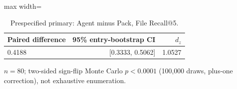 \begin{table}[t]
\centering
\caption{Prespecified primary: Agent minus Pack, File Recall@5.}\label{tab:primary}
\small
\begin{adjustbox}{max width=\columnwidth}\begin{tabular}{lrr}
\toprule
Paired difference & 95\% entry-bootstrap CI & $d_z$ \\
\midrule
0.4188 & [0.3333, 0.5062] & 1.0527 \\
\bottomrule
\end{tabular}\end{adjustbox}
\par\vspace{2pt}\begin{minipage}{\columnwidth}\footnotesize $n=80$; two-sided sign-flip Monte Carlo $p<0.0001$ (100,000 draws, plus-one correction), not exhaustive enumeration.\end{minipage}
\end{table}
